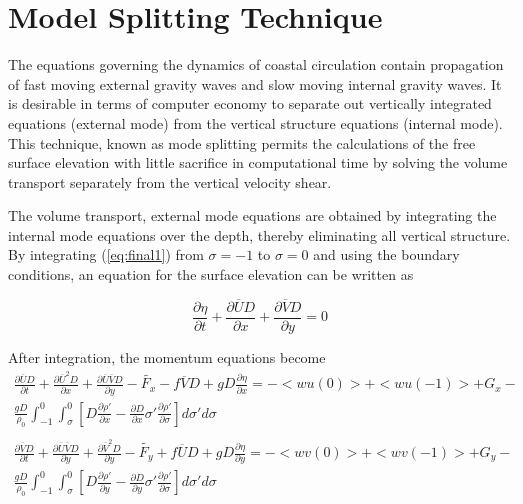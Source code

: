 \documentclass[oribibl]{llncs}
\begin{document}
\section{Model Splitting Technique}
 
The equations governing the dynamics of coastal circulation contain propagation of fast moving external gravity waves and slow moving internal gravity waves. It is desirable in terms of computer economy to separate out vertically integrated equations (external mode) from the vertical structure equations (internal mode). This technique, known as mode splitting permits the calculations of the free surface elevation with little sacrifice in computational time by solving the volume transport separately from the vertical velocity shear.

The volume transport, external mode equations are obtained by integrating the internal mode equations over the depth, thereby eliminating all vertical structure. By integrating (\ref{eq:final1}) from $\sigma=-1$ to $\sigma=0$ and using the boundary conditions, an equation for the surface elevation can be written as

\begin{equation}
\frac{\partial \eta}{\partial t} + \frac{\partial \overline{U}D}{\partial x} + \frac{\partial \overline{V}D}{\partial y} =0
\end{equation}

After integration, the momentum equations become
\begin{eqnarray}
\frac{\partial \overline{U} D}{\partial t} + \frac{\partial \overline{U}^2 D}{\partial x} +\frac{\partial \overline{U}\overline{V} D}{\partial y} - \tilde{F_x}-f \overline{V} D + gD \frac{\partial \eta}{\partial x} = -<wu(0)> +<wu(-1)> + G_x- \nonumber \\
 \frac{gD}{\rho_0} \int_{-1}^0 \int_{\sigma}^0 \left[ D \frac{\partial \rho'}{\partial x}  - \frac{\partial D}{\partial x} \sigma '  \frac{\partial \rho'}{\partial \sigma} \right] d \sigma ' d \sigma \label{eq:intm1} \\
\nonumber\\
 \frac{\partial \overline{V} D}{\partial t} + \frac{\partial \overline{U}\overline{V} D}{\partial y} +\frac{\partial \overline{V}^2 D}{\partial y} - \tilde{F_y} + f \overline{U} D + gD \frac{\partial \eta}{\partial y} = -<wv(0)> +<wv(-1)> + G_y- \nonumber \\
 \frac{gD}{\rho_0} \int_{-1}^0 \int_{\sigma}^0 \left[ D \frac{\partial \rho'}{\partial y}  - \frac{\partial D}{\partial y} \sigma '  \frac{\partial \rho'}{\partial \sigma} \right] d \sigma ' d \sigma  \label{eq:intm2} 
\end{eqnarray}
\end{document}
